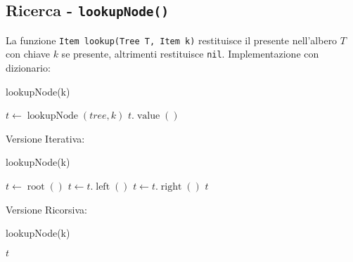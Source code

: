     \subsection{Ricerca - \texttt{lookupNode()}}
        La funzione \texttt{Item lookup(Tree T, Item k)} restituisce il presente nell'albero $ T $ con chiave $ k $ se presente, altrimenti restituisce \texttt{nil}.
        Implementazione con dizionario:
        \begin{algorithm}[H]
            \caption{lookupNode(\Item k)}
            \begin{algorithmic}
                \State \Tree $ t \gets \operatorname{lookupNode}(tree, k)$
                    \State \Return $ t.\operatorname{value}() $
                \Else
                    \State \Return \Nil
                \EndIf
            \end{algorithmic}
        \end{algorithm}
        Versione Iterativa:
        \begin{algorithm}[H]
            \caption{lookupNode(\Item k)}
            \begin{algorithmic}
                \State \Tree $ t \gets \operatorname{root}()$
                        \State $ t \gets t.\operatorname{left}() $
                    \Else
                        \State $ t \gets t.\operatorname{right}() $
                    \EndIf
                \EndWhile
                \State \Return $ t $
            \end{algorithmic}
        \end{algorithm}
        Versione Ricorsiva:
        \begin{algorithm}[H]
            \caption{lookupNode(\Item k)}
            \begin{algorithmic}
                        \State \Return $ t $
                    \EndIf
                        \State \Return {}
                    \Else
                        \State \Return {}
                    \EndIf
                \EndFunction
            \end{algorithmic}
        \end{algorithm}
